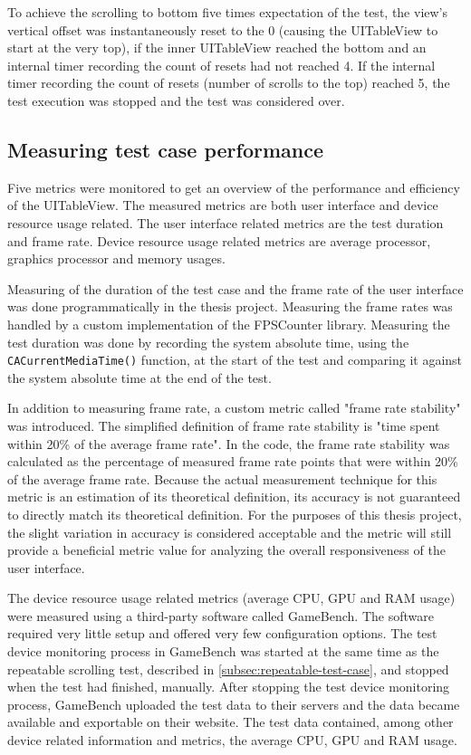 \documentclass[a4paper,12pt]{article}
\begin{document}
To achieve the scrolling to bottom five times expectation of the test, the view's vertical offset was instantaneously reset to the 0 (causing the UITableView to start at the very top), if the inner UITableView reached the bottom and an internal timer recording the count of resets had not reached 4. If the internal timer recording the count of resets (number of scrolls to the top) reached 5, the test execution was stopped and the test was considered over.

\subsection{Measuring test case performance}
Five metrics were monitored to get an overview of the performance and efficiency of the UITableView. The measured metrics are both user interface and device resource usage related. The user interface related metrics are the test duration and frame rate. Device resource usage related metrics are average processor, graphics processor and memory usages.

Measuring of the duration of the test case and the frame rate of the user interface was done programmatically in the thesis project. Measuring the frame rates was handled by a custom implementation of the FPSCounter\cite{FPSCounterGithub} library. Measuring the test duration was done by recording the system absolute time, using the \texttt{CACurrentMediaTime()} function, at the start of the test and comparing it against the system absolute time at the end of the test.

In addition to measuring frame rate, a custom metric called "frame rate stability" was introduced. The simplified definition of frame rate stability is "time spent within 20\% of the average frame rate". In the code, the frame rate stability was calculated as the percentage of measured frame rate points that were within 20\% of the average frame rate. Because the actual measurement technique for this metric is an estimation of its theoretical definition, its accuracy is not guaranteed to directly match its theoretical definition. For the purposes of this thesis project, the slight variation in accuracy is considered acceptable and the metric will still provide a beneficial metric value for analyzing the overall responsiveness of the user interface.

The device resource usage related metrics (average CPU, GPU and RAM usage) were measured using a third-party software called GameBench\cite{GameBenchHome}. The software required very little setup and offered very few configuration options. The test device monitoring process in GameBench was started at the same time as the repeatable scrolling test, described in \autoref{subsec:repeatable-test-case}, and stopped when the test had finished, manually. After stopping the test device monitoring process, GameBench uploaded the test data to their servers and the data became available and exportable on their website. The test data contained, among other device related information and metrics, the average CPU, GPU and RAM usage.
\end{document}
